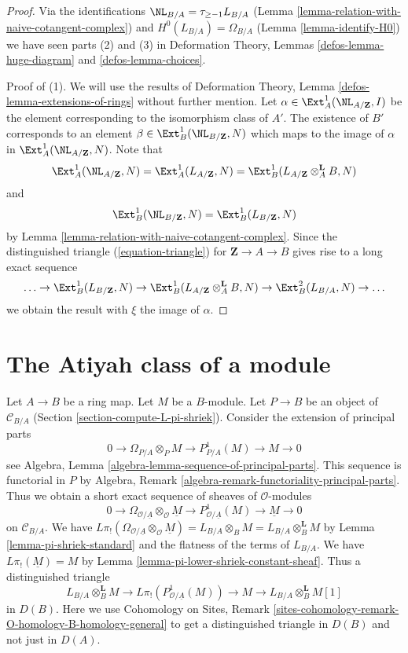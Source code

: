 \begin{proof}
Via the identifications $\NL_{B/A} = \tau_{\geq -1}L_{B/A}$
(Lemma \ref{lemma-relation-with-naive-cotangent-complex}) and
$H^0(L_{B/A}) = \Omega_{B/A}$
(Lemma \ref{lemma-identify-H0})
we have seen parts (2) and (3) in
Deformation Theory, Lemmas \ref{defos-lemma-huge-diagram} and
\ref{defos-lemma-choices}.

\medskip\noindent
Proof of (1). We will use the results of
Deformation Theory, Lemma \ref{defos-lemma-extensions-of-rings}
without further mention.
Let $\alpha \in \Ext^1_A(\NL_{A/\mathbf{Z}}, I)$
be the element corresponding to the isomorphism class of $A'$.
The existence of $B'$ corresponds to an element
$\beta \in \Ext_B^1(\NL_{B/\mathbf{Z}}, N)$
which maps to the image of $\alpha$ in
$\Ext^1_A(\NL_{A/\mathbf{Z}}, N)$. Note that
$$
\Ext^1_A(\NL_{A/\mathbf{Z}}, N) =
\Ext^1_A(L_{A/\mathbf{Z}}, N) =
\Ext^1_B(L_{A/\mathbf{Z}} \otimes_A^\mathbf{L} B, N)
$$
and
$$
\Ext^1_B(\NL_{B/\mathbf{Z}}, N) =
\Ext^1_B(L_{B/\mathbf{Z}}, N)
$$
by Lemma \ref{lemma-relation-with-naive-cotangent-complex}.
Since the distinguished triangle (\ref{equation-triangle})
for $\mathbf{Z} \to A \to B$ gives rise to a long exact sequence
$$
\ldots \to
\Ext^1_B(L_{B/\mathbf{Z}}, N) \to
\Ext^1_B(L_{A/\mathbf{Z}} \otimes_A^\mathbf{L} B, N) \to
\Ext^2_B(L_{B/A}, N) \to \ldots
$$
we obtain the result with $\xi$ the image of $\alpha$.
\end{proof}





\section{The Atiyah class of a module}
\label{section-atiyah}

\noindent
Let $A \to B$ be a ring map. Let $M$ be a $B$-module.
Let $P \to B$ be an object of $\mathcal{C}_{B/A}$
(Section \ref{section-compute-L-pi-shriek}).
Consider the extension of principal parts
$$
0 \to \Omega_{P/A} \otimes_P M \to P^1_{P/A}(M) \to M \to 0
$$
see Algebra, Lemma \ref{algebra-lemma-sequence-of-principal-parts}.
This sequence is functorial in $P$ by
Algebra, Remark \ref{algebra-remark-functoriality-principal-parts}.
Thus we obtain a short exact sequence of sheaves of $\mathcal{O}$-modules
$$
0 \to \Omega_{\mathcal{O}/\underline{A}} \otimes_\mathcal{O} \underline{M} \to
P^1_{\mathcal{O}/\underline{A}}(M) \to \underline{M} \to 0
$$
on $\mathcal{C}_{B/A}$. We have
$L\pi_!(\Omega_{\mathcal{O}/\underline{A}} \otimes_\mathcal{O} \underline{M})
= L_{B/A} \otimes_B M = L_{B/A} \otimes_B^\mathbf{L} M$
by Lemma \ref{lemma-pi-shriek-standard} and the flatness of
the terms of $L_{B/A}$.
We have $L\pi_!(\underline{M}) = M$ by
Lemma \ref{lemma-pi-lower-shriek-constant-sheaf}.
Thus a distinguished triangle
\begin{equation}
\label{equation-atiyah}
L_{B/A} \otimes_B^\mathbf{L} M \to
L\pi_!\left(P^1_{\mathcal{O}/\underline{A}}(M)\right) \to M
\to L_{B/A} \otimes_B^\mathbf{L} M [1]
\end{equation}
in $D(B)$. Here we use Cohomology on Sites, Remark
\ref{sites-cohomology-remark-O-homology-B-homology-general}
to get a distinguished triangle in $D(B)$ and not just in $D(A)$.

